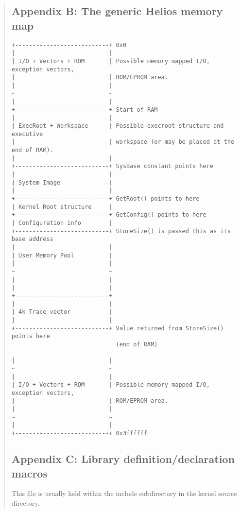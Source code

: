 \begin {quote}
\subsection*{Appendix B: The generic Helios memory map}
\scriptsize
\begin{verbatim}
+---------------------------+ 0x0
|                           |
| I/O + Vectors + ROM       | Possible memory mapped I/O, exception vectors,
|                           | ROM/EPROM area.
|                           |
~                           ~
|                           |
+---------------------------+ Start of RAM
|                           |
| ExecRoot + Workspace      | Possible execroot structure and executive 
|                           | workspace (or may be placed at the end of RAM).
|                           |
+---------------------------+ SysBase constant points here
|                           |
| System Image              |
|                           |
+---------------------------+ GetRoot() points to here
| Kernel Root structure     |
+---------------------------+ GetConfig() points to here
| Configuration info        |
+---------------------------+ StoreSize() is passed this as its base address
|                           |
| User Memory Pool          |
|                           |
~                           ~
|                           |
|                           |
+---------------------------+
|                           |
| 4k Trace vector           |
|                           |
+---------------------------+ Value returned from StoreSize() points here
                              (end of RAM)

|                           |
~                           ~
|                           |
| I/O + Vectors + ROM       | Possible memory mapped I/O, exception vectors,
|                           | ROM/EPROM area.
|                           |
~                           ~
|                           |
+---------------------------+ 0x3ffffff 
\end{verbatim}
\normalsize
\vfill
\newpage
\small
\subsection*{Appendix C: Library definition/declaration macros}
\normalsize
This file is usually held within the include subdirectory in the kernel
source directory.


\end{quote}
